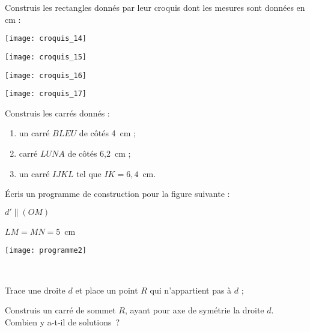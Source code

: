 \columnbreak

\begin{exercice}
Construis les rectangles donnés par leur croquis dont les mesures sont données en cm :
\begin{colenumerate}{2}
 \item
 
 \texttt{[image: croquis\_14]}
  \item
 
 \texttt{[image: croquis\_15]}
  \item
 
 \texttt{[image: croquis\_16]}
  \item
 
 \texttt{[image: croquis\_17]}
 \end{colenumerate}
\end{exercice}







\begin{exercice}
Construis les carrés donnés :
\begin{enumerate}
 \item un carré $BLEU$ de côtés 4 cm ;
 \item carré $LUNA$ de côtés 6,2 cm ;
 \item un carré $IJKL$ tel que $IK = 6,4$ cm.
 \end{enumerate} 
\end{exercice}


\begin{exercice}
Écris un programme de construction pour la figure suivante :

\begin{minipage}[c]{0.46\linewidth}
$d' \parallel (OM)$

$LM = MN = 5$ cm
 \end{minipage} \hfill%
 \begin{minipage}[c]{0.46\linewidth}
  \texttt{[image: programme2]}
  \end{minipage} \\
\end{exercice}


\begin{exercice}
Trace une droite $d$ et place un point $R$ qui n'appartient pas à $d$ ;

Construis un carré de sommet $R$, ayant pour axe de symétrie la droite $d$. Combien y a‑t‑il de solutions ?

\end{exercice}


